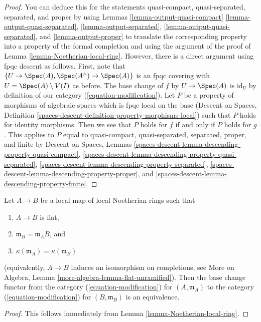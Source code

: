 \begin{proof}
You can deduce this for the statements
quasi-compact, quasi-separated, separated, and proper
by using Lemmas \ref{lemma-output-quasi-compact}
\ref{lemma-output-quasi-separated},
\ref{lemma-output-separated},
\ref{lemma-output-quasi-separated}, and
\ref{lemma-output-proper}
to translate the corresponding property into a property
of the formal completion and using the argument of the proof
of Lemma \ref{lemma-Noetherian-local-ring}.
However, there is a direct argument using fpqc descent as follows.
First, note that $\{U \to \Spec(A), \Spec(A^\wedge) \to \Spec(A)\}$ is an
fpqc covering with $U = \Spec(A) \setminus V(I)$ as before.
The base change of $f$ by $U \to \Spec(A)$ is $\text{id}_U$
by definition of our category (\ref{equation-modification}).
Let $P$ be a property of morphisms of algebraic spaces which
is fpqc local on the base (Descent on Spaces, Definition
\ref{spaces-descent-definition-property-morphisms-local})
such that $P$ holds for identity morphisms.
Then we see that $P$ holds for $f$ if and only if $P$ holds for $g$.
This applies to $P$ equal to
quasi-compact, quasi-separated, separated, proper, and finite
by
Descent on Spaces, Lemmas
\ref{spaces-descent-lemma-descending-property-quasi-compact},
\ref{spaces-descent-lemma-descending-property-quasi-separated},
\ref{spaces-descent-lemma-descending-property-separated},
\ref{spaces-descent-lemma-descending-property-proper}, and
\ref{spaces-descent-lemma-descending-property-finite}.
\end{proof}

\begin{lemma}
\label{lemma-equivalence-to-completion}
Let $A \to B$ be a local map of local Noetherian rings such that
\begin{enumerate}
\item $A \to B$ is flat,
\item $\mathfrak m_B = \mathfrak m_A B$, and
\item $\kappa(\mathfrak m_A) = \kappa(\mathfrak m_B)$
\end{enumerate}
(equivalently, $A \to B$ induces an isomorphism on completions, see
More on Algebra, Lemma \ref{more-algebra-lemma-flat-unramified}).
Then the base change functor from the category
(\ref{equation-modification}) for $(A, \mathfrak m_A)$ to the category
(\ref{equation-modification}) for $(B, \mathfrak m_B)$
is an equivalence.
\end{lemma}

\begin{proof}
This follows immediately from Lemma \ref{lemma-Noetherian-local-ring}.
\end{proof}

